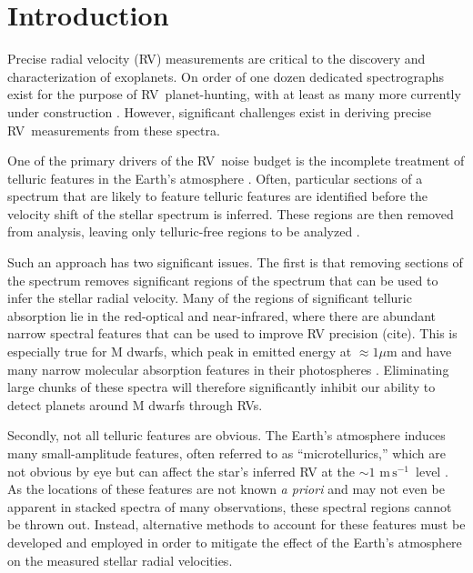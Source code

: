\documentclass[twocolumn]{aastex62}
\newcommand{\unit}[1]{\mathrm{#1}}
\newcommand{\m}{\unit{m}}
\newcommand{\cm}{\unit{cm}}
\newcommand{\s}{\unit{s}}
\newcommand{\cms}{$\cm\,\s^{-1}$}
\newcommand{\ms}{$\m\,\s^{-1}$}
\newcommand{\acronym}[1]{{\small{#1}}}
\newcommand{\RV}{\acronym{RV}}
\newcommand{\EPRV}{\acronym{EPRV}}
\begin{document}
\section{Introduction}

Precise radial velocity (\RV) measurements are critical to the discovery and characterization of exoplanets. 
On order of one dozen dedicated spectrographs exist for the purpose of \RV\ planet-hunting, with at least as many more currently under construction \citep{Wright2017}. 
However, significant challenges exist in deriving precise \RV\ measurements from these spectra. 

One of the primary drivers of the \RV\ noise budget is the incomplete treatment of telluric features in the
Earth's atmosphere \citep{Halverson2016}. 
Often, particular sections of a spectrum that are likely to feature telluric features are identified before the velocity shift of the stellar spectrum is inferred. 
These regions are then removed from analysis, leaving only telluric-free regions to be analyzed \citep[e.g.][]{AngladaEscude2012}.

Such an approach has two significant issues. 
The first is that removing sections of the spectrum removes significant regions of the spectrum that can be used to infer the stellar radial velocity. 
Many of the regions of significant telluric absorption lie in the red-optical and near-infrared, where there are abundant narrow spectral features that can be used to improve RV precision (cite).
This is especially true for M dwarfs, which peak in emitted energy at $\approx 1 \mu$m and have many narrow molecular absorption features in their photospheres \citep{Figueira2016}.
Eliminating large chunks of these spectra will therefore significantly inhibit our ability to detect planets around M dwarfs through RVs.

Secondly, not all telluric features are obvious. 
The Earth's atmosphere induces many small-amplitude features, often referred to as ``microtellurics,'' which are not obvious by eye but can affect the star's inferred RV at the $\sim 1$ \ms\ level \citep{Cunha2014}. 
As the locations of these features are not known \textit{a priori} and may not even be apparent in stacked spectra of many observations, these spectral regions cannot be thrown out. 
Instead, alternative methods to account for these features must be developed and employed in order to mitigate the effect of the Earth's atmosphere on the measured stellar radial velocities.
\end{document}
